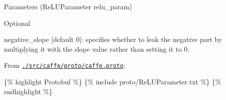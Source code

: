 \begin{DoxyItemize}
\item Parameters ({\ttfamily Re\+L\+U\+Parameter relu\+\_\+param})
\begin{DoxyItemize}
\item Optional
\begin{DoxyItemize}
\item {\ttfamily negative\+\_\+slope} \mbox{[}default 0\mbox{]}\+: specifies whether to leak the negative part by multiplying it with the slope value rather than setting it to 0.
\end{DoxyItemize}
\end{DoxyItemize}
\item From \href{https://github.com/BVLC/caffe/blob/master/src/caffe/proto/caffe.proto}{\tt {\ttfamily ./src/caffe/proto/caffe.proto}}\+:
\end{DoxyItemize}

\{\% highlight Protobuf \%\} \{\% include proto/\+Re\+L\+U\+Parameter.\+txt \%\} \{\% endhighlight \%\} 